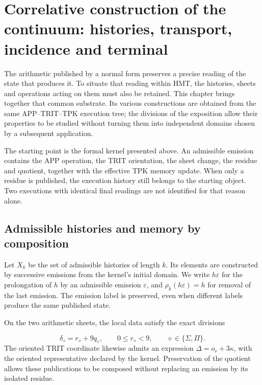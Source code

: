 \section{Correlative construction of the continuum: histories, transport, incidence and terminal}
\label{x_reciprocidad:iv:continuo-conjunto}
The arithmetic published by a normal form preserves a precise reading of the state that produces it. To situate that reading within HMT, the histories, sheets and operations acting on them must also be retained. This chapter brings together that common substrate. Its various constructions are obtained from the same APP–TRIT–TPK execution tree; the divisions of the exposition allow their properties to be studied without turning them into independent domains chosen by a subsequent application.

The starting point is the formal kernel presented above. An admissible emission contains the APP operation, the TRIT orientation, the sheet change, the residue and quotient, together with the effective TPK memory update. When only a residue is published, the execution history still belongs to the starting object. Two executions with identical final readings are not identified for that reason alone.

\subsection{Admissible histories and memory by composition}
\label{x_reciprocidad:iv:cont:historias}
Let \(X_k\) be the set of admissible histories of length \(k\). Its elements are constructed by successive emissions from the kernel's initial domain. We write \(h\varepsilon\) for the prolongation of \(h\) by an admissible emission \(\varepsilon\), and \(\rho_k(h\varepsilon)=h\) for removal of the last emission. The emission label is preserved, even when different labels produce the same published state.

On the two arithmetic sheets, the local data satisfy the exact divisions

\[
\delta_\diamond=r_\diamond+9q_\diamond,
\qquad 0\leq r_\diamond<9,
\qquad \diamond\in\{\Sigma,\Pi\}.
\]
The oriented TRIT coordinate likewise admits an expression \(\Delta=o_r+3\kappa\), with the oriented representative declared by the kernel. Preservation of the quotient allows these publications to be composed without replacing an emission by its isolated residue.


